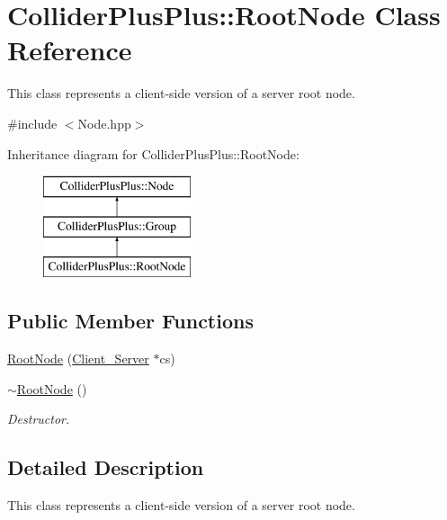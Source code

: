 \hypertarget{classColliderPlusPlus_1_1RootNode}{\section{Collider\-Plus\-Plus\-:\-:Root\-Node Class Reference}
\label{classColliderPlusPlus_1_1RootNode}
}


This class represents a client-\/side version of a server root node.  




{\ttfamily \#include $<$Node.\-hpp$>$}

Inheritance diagram for Collider\-Plus\-Plus\-:\-:Root\-Node\-:\begin{figure}[H]
\begin{center}
\leavevmode
\includegraphics[height=3.000000cm]{classColliderPlusPlus_1_1RootNode}
\end{center}
\end{figure}
\subsection*{Public Member Functions}
\begin{DoxyCompactItemize}
\item 
\hyperlink{classColliderPlusPlus_1_1RootNode_a6fcf7a82057e308fdee207298ffe1c4a}{Root\-Node} (\hyperlink{classColliderPlusPlus_1_1Client__Server}{Client\-\_\-\-Server} $\ast$cs)
\item 
\hypertarget{classColliderPlusPlus_1_1RootNode_a0b1f3caa18d7176ec4766990cadb48c4}{\hyperlink{classColliderPlusPlus_1_1RootNode_a0b1f3caa18d7176ec4766990cadb48c4}{$\sim$\-Root\-Node} ()}\label{classColliderPlusPlus_1_1RootNode_a0b1f3caa18d7176ec4766990cadb48c4}

\begin{DoxyCompactList}\small\item\em Destructor. \end{DoxyCompactList}\end{DoxyCompactItemize}


\subsection{Detailed Description}
This class represents a client-\/side version of a server root node. 

